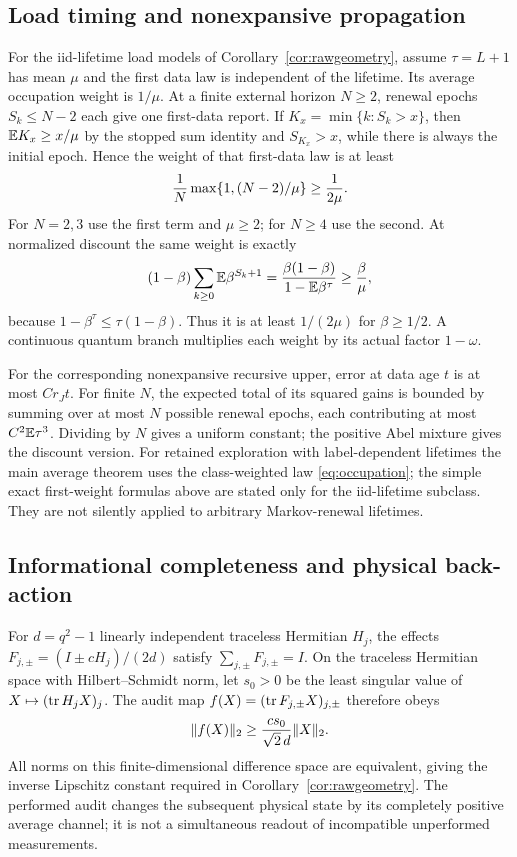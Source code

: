 \subsection{Load timing and nonexpansive propagation}
For the iid-lifetime load models of Corollary~\ref{cor:rawgeometry}, assume $\tau=L+1$ has mean $\mu$ and the first data law is independent of the lifetime. Its average occupation weight is $1/\mu$. At a finite external horizon $N\ge2$, renewal epochs $S_k\le N-2$ each give one first-data report. If $K_x=\min\{k:S_k>x\}$, then $\mathbb E K_x\ge x/\mu$ by the stopped sum identity and $S_{K_x}>x$, while there is always the initial epoch. Hence the weight of that first-data law is at least
\begin{equation}\label{eq:firstweight}
 {1\over N}\max\{1,(N-2)/\mu\}\ge {1\over2\mu}.
\end{equation}
For $N=2,3$ use the first term and $\mu\ge2$; for $N\ge4$ use the second. At normalized discount the same weight is exactly
\begin{equation}\label{eq:discountweight}
 (1-\beta)\sum_{k\ge0}\mathbb E\beta^{S_k+1}
 ={\beta(1-\beta)\over1-\mathbb E\beta^\tau}
 \ge{\beta\over\mu},
\end{equation}
because $1-\beta^\tau\le\tau(1-\beta)$. Thus it is at least $1/(2\mu)$ for $\beta\ge1/2$. A continuous quantum branch multiplies each weight by its actual factor $1-\omega$.

For the corresponding nonexpansive recursive upper, error at data age $t$ is at most $C r_J t$. For finite $N$, the expected total of its squared gains is bounded by summing over at most $N$ possible renewal epochs, each contributing at most $C^2\mathbb E\tau^3$. Dividing by $N$ gives a uniform constant; the positive Abel mixture gives the discount version. For retained exploration with label-dependent lifetimes the main average theorem uses the class-weighted law \eqref{eq:occupation}; the simple exact first-weight formulas above are stated only for the iid-lifetime subclass. They are not silently applied to arbitrary Markov-renewal lifetimes.

\subsection{Informational completeness and physical back-action}
For $d=q^2-1$ linearly independent traceless Hermitian $H_j$, the effects
$F_{j,\pm}=(I\pm cH_j)/(2d)$ satisfy
$\sum_{j,\pm}F_{j,\pm}=I$.
On the traceless Hermitian space with Hilbert--Schmidt norm, let $s_0>0$ be the least singular value of $X\mapsto(\operatorname{tr} H_jX)_j$. The audit map $f(X)=(\operatorname{tr} F_{j,\pm}X)_{j,\pm}$ therefore obeys
\begin{equation}\label{eq:icconstant}
 \lVert f(X)\rVert_2\ge {c s_0\over\sqrt2\,d}\lVert X\rVert_2.
\end{equation}
All norms on this finite-dimensional difference space are equivalent, giving the inverse Lipschitz constant required in Corollary~\ref{cor:rawgeometry}. The performed audit changes the subsequent physical state by its completely positive average channel; it is not a simultaneous readout of incompatible unperformed measurements.

